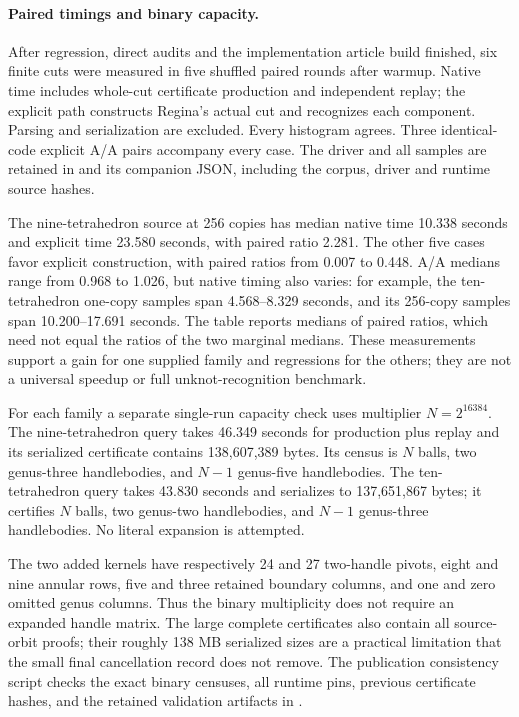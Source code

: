 \paragraph{Paired timings and binary capacity.}
After regression, direct audits and the implementation article build
finished, six finite cuts were measured in five shuffled paired rounds after
warmup. Native time includes whole-cut certificate production and independent
replay; the explicit path constructs Regina's actual cut and recognizes each
component. Parsing and serialization are excluded. Every histogram agrees.
Three identical-code explicit A/A pairs accompany every case. The driver and
all samples are retained in  and its
companion JSON, including the corpus, driver and runtime source hashes.



The nine-tetrahedron source at 256 copies has median native time 10.338
seconds and explicit time 23.580 seconds, with paired ratio 2.281. The other
five cases favor explicit construction, with paired ratios from 0.007 to
0.448. A/A medians range from 0.968 to 1.026, but native timing also varies:
for example, the ten-tetrahedron one-copy samples span 4.568--8.329 seconds,
and its 256-copy samples span 10.200--17.691 seconds. The table reports medians
of paired ratios, which need not equal the ratios of the two marginal medians.
These measurements support a gain for one supplied family and regressions
for the others; they are not a universal speedup or full unknot-recognition
benchmark.

For each family a separate single-run capacity check uses multiplier
$N=2^{16384}$. The nine-tetrahedron query takes 46.349 seconds for production
plus replay and its serialized certificate contains 138,607,389 bytes.
Its census is $N$ balls, two genus-three handlebodies, and $N-1$ genus-five
handlebodies. The ten-tetrahedron query takes 43.830 seconds and serializes
to 137,651,867 bytes; it certifies $N$ balls, two genus-two handlebodies, and
$N-1$ genus-three handlebodies. No literal expansion is attempted.

The two added kernels have respectively 24 and 27 two-handle pivots,
eight and nine annular rows, five and three retained boundary columns,
and one and zero omitted genus columns. Thus the binary multiplicity does
not require an expanded handle matrix. The large complete certificates also
contain all source-orbit proofs; their roughly 138 MB serialized sizes are
a practical limitation that the small final cancellation record does not
remove. The publication consistency script checks the exact binary censuses,
all runtime pins, previous certificate hashes, and the retained validation
artifacts in .

